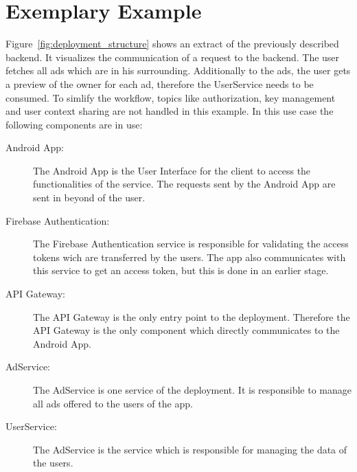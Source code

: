 \section{Exemplary Example}
Figure~\ref{fig:deployment_structure} shows an extract of the previously described backend.
It visualizes the communication of a request to the backend.
The user fetches all ads which are in his surrounding.
Additionally to the ads, the user gets a preview of the owner for each ad, therefore the UserService needs to be consumed.
To simlify the workflow, topics like authorization, key management and user context sharing are not handled in this example.
In this use case the following components are in use: 
\begin{description}
	\item[Android App:] The Android App is the User Interface for the client to access the functionalities of the service.
		The requests sent by the Android App are sent in beyond of the user.
	\item[Firebase Authentication:] The Firebase Authentication service is responsible for validating the access tokens wich are transferred by the users.
		The app also communicates with this service to get an access token, but this is done in an earlier stage.
	\item[API Gateway:] The API Gateway is the only entry point to the deployment.
		Therefore the API Gateway is the only component which directly communicates to the Android App.
	\item[AdService:] The AdService is one service of the deployment.
		It is responsible to manage all ads offered to the users of the app.
	\item[UserService:] The AdService is the service which is responsible for managing the data of the users.
\end{description}

